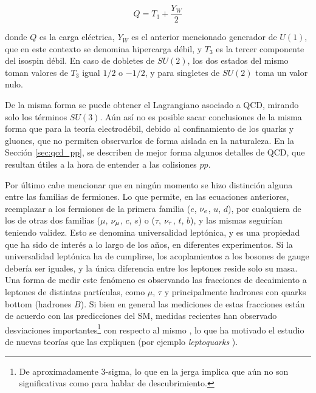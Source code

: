 \begin{equation}
Q = T_3 + \frac{Y_W}{2} 
\end{equation}

\noindent
donde $Q$ es la carga eléctrica, $Y_W$ es el anterior mencionado generador de $U(1)$, que en este contexto se denomina hipercarga débil, y $T_3$ es la tercer componente del isospin débil. En caso de dobletes de $SU(2)$, los dos estados del mismo toman valores de $T_3$ igual $1/2$ o $-1/2$, y para singletes de $SU(2)$ toma un valor nulo.

De la misma forma se puede obtener el Lagrangiano asociado a QCD, mirando solo los términos $SU(3)$. Aún así no es posible sacar conclusiones de la misma forma que para la teoría electrodébil, debido al confinamiento de los quarks y gluones, que no permiten observarlos de forma aislada en la naturaleza. En la Sección \ref{sec:qcd_pp}, se describen de mejor forma algunos detalles de QCD, que resultan útiles a la hora de entender a las colisiones $pp$.

Por último cabe mencionar que en ningún momento se hizo distinción alguna entre las familias de fermiones. Lo que permite, en las ecuaciones anteriores, reemplazar a los fermiones de la primera familia ($e$, $\nu_e$, $u$, $d$), por cualquiera de los de otras dos familias ($\mu$, $\nu_{\mu}$, $c$, $s$) o ($\tau$, $\nu_{\tau}$, $t$, $b$), y las mismas seguirían teniendo validez.
Esto se denomina universalidad leptónica, y es una propiedad que ha sido de interés a lo largo de los años, en diferentes experimentos. Si la universalidad leptónica ha de cumplirse, los acoplamientos a los bosones de gauge debería ser iguales, y la única diferencia entre los leptones reside solo su masa. Una forma de medir este fenómeno es observando las fracciones de decaimiento a leptones de distintas partículas, como $\mu$, $\tau$ y principalmente hadrones con quarks bottom (hadrones $B$). Si bien en general las mediciones de estas fracciones están de acuerdo con las predicciones del SM, medidas recientes han observado desviaciones importantes\footnote{De aproximadamente 3-sigma, lo que en la jerga implica que aún no son significativas como para hablar de descubrimiento.} con respecto al mismo \cite{lepton_uni_1, lepton_uni_2}, lo que ha motivado el estudio de nuevas teorías que las expliquen (por ejemplo \textit{leptoquarks} \cite{leptoquark_1, Okumura:2744026}).


